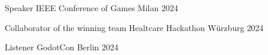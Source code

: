 

\begin{cvhonors}

  \cvhonor
    {Speaker} %
    {IEEE Conference of Games} %
    {Milan} %
    {2024} %

  \cvhonor
    {Collaborator of the winning team} %
    {Healtcare Hackathon} %
    {Würzburg} %
    {2024} %

  \cvhonor
    {Listener} %
    {GodotCon} %
    {Berlin} %
    {2024} %
    




\end{cvhonors}
